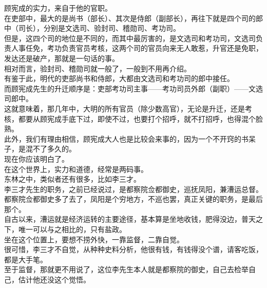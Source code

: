 \begin{multicols}{\theparacolNo}
顾宪成的实力，来自于他的官职。\\

在吏部中，最大的是尚书（部长）、其次是侍郎（副部长），再往下就是四个司的郎中（司长），分别是文选司、验封司、稽勋司、考功司。\\

但是，这四个司的地位是不同的，而其中最厉害的，是文选司和考功司，文选司负责人事任免，考功负责官员考核，这两个司的官员向来无人敢惹，升官还是免职，发达还是破产，那就是一句话的事。\\

相对而言，验封司、稽勋司就一般了，一般到不用再介绍。\\

有鉴于此，明代的吏部尚书和侍郎，大都由文选司和考功司的郎中接任。\\

而顾宪成先生的升迁顺序是：吏部考功司主事——考功司员外郎（副职）——文选司郎中。\\

这就意味着，那几年中，大明的所有官员（除少数高官），无论是升迁，还是考核，都要从顾宪成手底下过，即使不过，也要打个招呼，就不打招呼，也得混个脸熟。\\

此外，我们有理由相信，顾宪成大人也是比较会来事的，因为一个不开窍的书呆子，是混不了多久的。\\

现在你应该明白了。\\

在这个世界上，实力和道德，经常是两码事。\\

东林之中，类似者还有很多，比如李三才。\\

李三才先生的职务，之前已经说过，是都察院佥都御史，巡抚凤阳，兼漕运总督。\\

都察院佥都御史多了去了，凤阳是个穷地方，不巡也罢，真正关键的职务，是最后那个。\\

自古以来，漕运就是经济运转的主要途径，基本算是坐地收钱，肥得没边，普天之下，唯一可以与之相比的，只有盐政。\\

坐在这个位置上，要想不捞外快，一靠监督，二靠自觉。\\

很可惜，李三才不自觉，从种种史料分析，他很有钱，有钱得没个谱，请客吃饭，都是大手笔。\\

至于监督，那就更不用说了，这位李先生本人就是都察院的御史，自己去检举自己，估计他还没这个觉悟。\\


\end{multicols}
